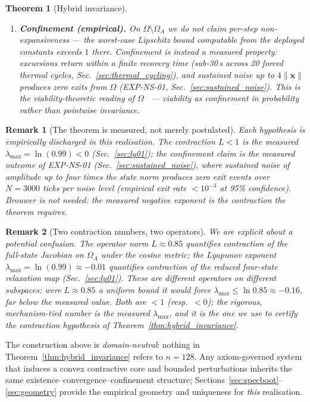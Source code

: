 \documentclass[11pt, a4paper]{article}
\newtheorem{theorem}{Theorem}
\newtheorem{remark}{Remark}
\newcommand{\sv}{\bm{x}}
\begin{document}
\begin{theorem}[Hybrid invariance]
\begin{enumerate}
  \item \textbf{Confinement (empirical).} On $\Omega \setminus \Omega_A$ we
        do not claim per-step non-expansiveness --- the worst-case Lipschitz
        bound computable from the deployed constants exceeds $1$ there.
        Confinement is instead a measured property: excursions return within
        a finite recovery time (sub-30\,s across 20 forced thermal cycles,
        Sec.~\ref{sec:thermal_cycling}), and sustained noise up to
        $4\lVert \sv\rVert$ produces zero exits from $\Omega$ (EXP-NS-01,
        Sec.~\ref{sec:sustained_noise}). This is the viability-theoretic
        reading of $\Omega$~\cite{aubin1991viability} --- viability as
        confinement in probability rather than pointwise invariance.
\end{enumerate}
\end{theorem}

\begin{remark}[The theorem is measured, not merely postulated]
Each hypothesis is empirically discharged in this realisation. The contraction
$L<1$ is the measured $\lambda_\text{max} = \ln(0.99) < 0$
(Sec.~\ref{sec:ly01}); the confinement claim is the measured outcome of
EXP-NS-01 (Sec.~\ref{sec:sustained_noise}), where sustained noise of amplitude
up to four times the state norm produces zero exit events over $N=3000$ ticks
per noise level (empirical exit rate $< 10^{-3}$ at 95\% confidence). Brouwer
is not needed: the measured negative exponent \emph{is} the contraction the
theorem requires.
\end{remark}

\begin{remark}[Two contraction numbers, two operators]
We are explicit about a potential confusion. The operator norm $L \approx 0.85$
quantifies contraction of the full-state Jacobian on $\Omega_A$ under the cosine
metric; the Lyapunov exponent $\lambda_\text{max} = \ln(0.99) \approx -0.01$
quantifies contraction of the reduced four-state relaxation map
(Sec.~\ref{sec:ly01}). These are different operators on different subspaces:
were $L\approx 0.85$ a uniform bound it would force
$\lambda_\text{max} \le \ln 0.85 \approx -0.16$, far below the measured value.
Both are $<1$ (resp.\ $<0$); the rigorous, mechanism-tied number is the measured
$\lambda_\text{max}$, and it is the one we use to certify the contraction
hypothesis of Theorem~\ref{thm:hybrid_invariance}.
\end{remark}

The construction above is \emph{domain-neutral}: nothing in
Theorem~\ref{thm:hybrid_invariance} refers to $n=128$. Any axiom-governed system
that induces a convex contractive core and bounded perturbations inherits the
same existence--convergence--confinement structure;
Sections~\ref{sec:specboot}--\ref{sec:geometry} provide the empirical geometry
and uniqueness for \emph{this} realisation.
\end{document}
